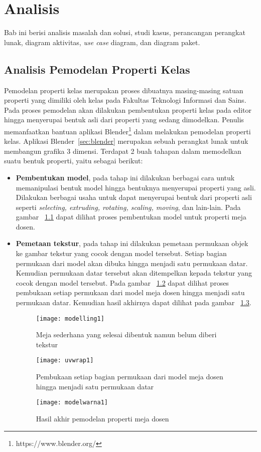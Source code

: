 \chapter{Analisis}
\label{chap:analisis}
Bab ini berisi analisis masalah dan solusi, studi kasus, perancangan perangkat lunak, diagram aktivitas, \textit{use case} diagram, dan diagram paket.

\section{Analisis Pemodelan Properti Kelas}
\label{sec:pemodelanproperti}
Pemodelan properti kelas merupakan proses dibuatnya masing-masing satuan properti yang dimiliki oleh kelas pada Fakultas Teknologi Informasi dan Sains. Pada proses pemodelan akan dilakukan pembentukan properti kelas pada editor hingga menyerupai bentuk asli dari properti yang sedang dimodelkan. Penulis memanfaatkan bantuan aplikasi Blender\footnote[1]{https://www.blender.org/} dalam melakukan pemodelan properti kelas. Aplikasi Blender~\ref{sec:blender} merupakan sebuah perangkat lunak untuk membangun grafika 3 dimensi. Terdapat 2 buah tahapan dalam memodelkan suatu bentuk properti, yaitu sebagai berikut:
\begin{itemize}
	\item {\bf Pembentukan model}, pada tahap ini dilakukan berbagai cara untuk memanipulasi bentuk model hingga bentuknya menyerupai properti yang asli. Dilakukan berbagai usaha untuk dapat menyerupai bentuk dari properti asli seperti {\it selecting, extruding, rotating, scaling, moving}, dan lain-lain. Pada gambar ~\ref{fig:modelling1} dapat dilihat proses pembentukan model untuk properti meja dosen.
	\item {\bf Pemetaan tekstur}, pada tahap ini dilakukan pemetaan permukaan objek ke gambar tekstur yang cocok dengan model tersebut. Setiap bagian permukaan dari model akan dibuka hingga menjadi satu permukaan datar. Kemudian permukaan datar tersebut akan ditempelkan kepada tekstur yang cocok dengan model tersebut. Pada gambar ~\ref{fig:uvwrap1} dapat dilihat proses pembukaan setiap permukaan dari model meja dosen hingga menjadi satu permukaan datar. Kemudian hasil akhirnya dapat dilihat pada gambar ~\ref{fig:modelwarna1}.
	\begin{figure}
		\centering
		\texttt{[image: modelling1]}
		\caption{Meja sederhana yang selesai dibentuk namun belum diberi tekstur}
		\label{fig:modelling1}
	\end{figure}
	\begin{figure}
		\centering
		\texttt{[image: uvwrap1]}
		\caption{Pembukaan setiap bagian permukaan dari model meja dosen hingga menjadi satu permukaan datar}
		\label{fig:uvwrap1}
	\end{figure}
	\begin{figure}
		\centering
		\texttt{[image: modelwarna1]}
		\caption{Hasil akhir pemodelan properti meja dosen}
		\label{fig:modelwarna1}
	\end{figure}
\end{itemize}

